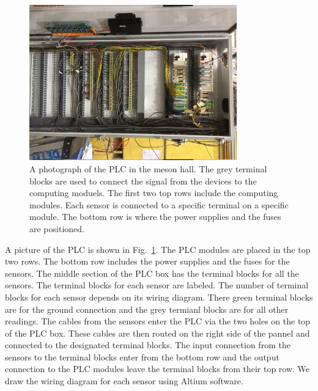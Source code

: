 \begin{figure}[h!]
  \centering
  \includegraphics[width=0.8\textwidth, angle = 90]{PLC.JPG}
  \caption{A photograph of the PLC in the meson hall. The grey
    terminal blocks are used to connect the signal from the devices to
    the computing moduels. The first two top rows include the
    computing modules. Each sensor is connected to a specific terminal
    on a specific module. The bottom row is where the power supplies
    and the fuses are positioned. }
  \label{fig:PLC}
\end{figure}

A picture of the PLC is shown in Fig.~\ref{fig:PLC}. The PLC modules
are placed in the top two rows. The bottom row includes the power
supplies and the fuses for the sensors. The middle section of the PLC
box has the terminal blocks for all the sensors. The terminal blocks
for each sensor are labeled. The number of terminal blocks for each
sensor depends on its wiring diagram. There green terminal blocks are
for the ground connection and the grey termianl blocks are for all
other readings.  The cables from the sensors enter the PLC via the two
holes on the top of the PLC box. These cables are then routed on the
right side of the pannel and connected to the designated terminal
blocks. The input connection from the sensors to the terminal blocks
enter from the bottom row and the output connection to the PLC modules
leave the terminal blocks from their top row. We draw the wiring
diagram for each sensor using Altium software.

